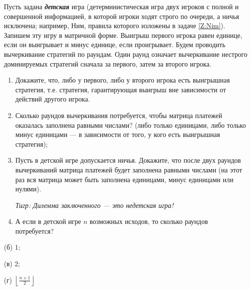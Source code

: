 \begin{problem}[Детские игры \cite{ewerhart:clg}] %
Пусть задана {\bf {\it детская}} игра (детерминистическая игра двух игроков с полной и совершенной информацией, в которой игроки ходят строго по очереди, а ничья исключена; например, Ним, правила которого изложены в задаче \ref{Z:Nim}). Запишем эту игру в матричной форме. Выигрыш первого игрока равен единице, если он выигрывает и минус единице, если проигрывает. Будем проводить вычеркивание стратегий по раундам. Один раунд означает вычеркивание нестрого доминируемых стратегий сначала за первого, затем за второго игрока.\par
\begin{enumerate}
\item 	Докажите, что, либо у первого, либо у второго игрока есть выигрышная стратегия, т.е. стратегия, гарантирующая выигрыш вне зависимости от действий другого игрока.\par
\item 	Сколько раундов вычеркивания потребуется, чтобы матрица платежей оказалась заполнена равными числами? (либо только единицами, либо только минус единицами --- в зависимости от того, у кого есть выигрышная стратегия);\par
\item 	Пусть в детской игре допускается ничья. Докажите, что после двух раундов вычеркиваний матрица платежей будет заполнена равными числами (на этот раз вся матрица может быть заполнена единицами, минус единицами или нулями).\par
{\it Тигр: Дилемма заключенного --- это недетская игра!}\par

\item А если в детской игре $n$ возможных исходов, то сколько раундов потребуется?
\end{enumerate}


\begin{sol}
(б) 1; 

(в) 2; 

(г) $\left\lfloor  \frac{n+1}{2} \right\rfloor$
\end{sol}
\end{problem}


